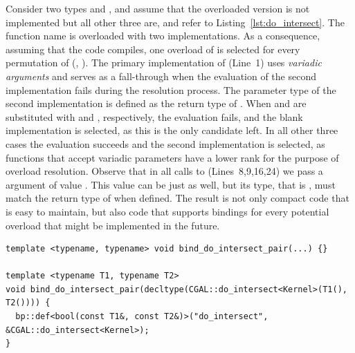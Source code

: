 Consider two types  and
, and assume that the
overloaded version is not implemented but all other three are, and 
refer to Listing~\ref{lst:do_intersect}.
The function name  is 
overloaded with two implementations. As a consequence, assuming that
the code compiles, one overload of
 is selected for every
permutation of (, ). The
primary implementation of 
(Line~1) uses \emph{variadic arguments} and serves as a fall-through
when the evaluation of the second implementation fails during the
resolution process.
The parameter type of the second implementation is defined as the
return type of . When  and  are substituted
with  and , respectively, the
evaluation fails, and the blank implementation is selected, as this is
the only candidate left. In all other three cases the evaluation
succeeds and the second implementation is selected, as functions that
accept variadic parameters have a lower rank for the purpose of
overload resolution.
Observe that in all calls to 
(Lines~8,9,16,24) we pass a  argument of value
. This value can be  just as
well, but its type, that is , must match the return
type of  when
defined. The result is not only compact code that is easy to maintain,
but also code that supports bindings for every potential
 overload that might be implemented
in the future.

\begin{lstfloat}
  \begin{lstlisting}[style=cppFramedStyle,basicstyle=\normalsize,%
                     label={lst:do_intersect},%
                     caption={Automatic generation of binding  for \cppLstinline{CGAL::do_intersect()} exploiting SFINAE.}]
template <typename, typename> void bind_do_intersect_pair(...) {}

template <typename T1, typename T2>
void bind_do_intersect_pair(decltype(CGAL::do_intersect<Kernel>(T1(), T2()))) {
  bp::def<bool(const T1&, const T2&)>("do_intersect", &CGAL::do_intersect<Kernel>);
}
  \end{lstlisting}
\end{lstfloat}

